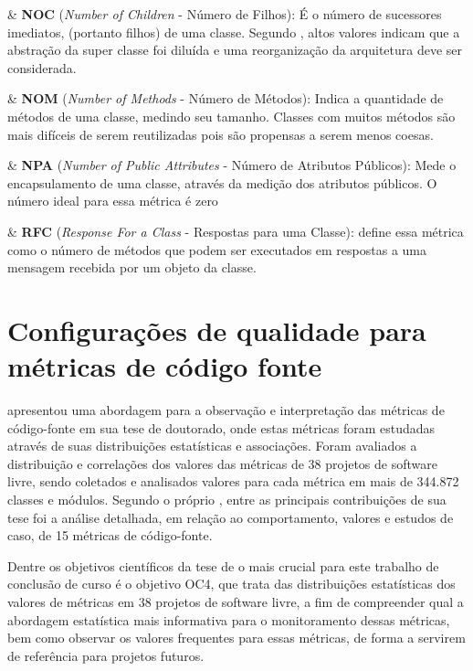 \begin{easylist}
	& \textbf{NOC} (\textit{Number of Children} - Número de Filhos): É o número de sucessores imediatos,  (portanto filhos) de uma classe. Segundo , altos valores indicam que a abstração da super classe foi diluída e uma reorganização da arquitetura deve ser considerada.
	
	& \textbf{NOM} (\textit{Number of Methods} - Número de Métodos): Indica a quantidade de métodos de uma classe, medindo seu tamanho. Classes com muitos métodos são mais difíceis de serem reutilizadas pois são propensas a serem menos coesas. \cite{Meirelles2013}  

	& \textbf{NPA} (\textit{Number of Public Attributes} - Número de Atributos Públicos): Mede o encapsulamento de uma classe, através da medição dos atributos públicos. O número ideal para essa métrica é zero \cite{Meirelles2013}

	& \textbf{RFC} (\textit{Response For a Class} - Respostas para uma Classe):  define essa métrica como o número de métodos que podem ser executados em respostas a uma mensagem recebida por um objeto da classe.

\end{easylist}	


\section{Configurações de qualidade para métricas de código fonte} 

 apresentou uma abordagem para a observação e interpretação das métricas de código-fonte em sua tese de doutorado, onde estas métricas foram estudadas através de suas distribuições estatísticas e associações. Foram avaliados a distribuição e correlações dos valores das métricas de 38 projetos de software livre, sendo coletados e analisados valores para cada métrica em mais de 344.872 classes e módulos. Segundo o próprio , entre as principais contribuições de sua tese foi a análise detalhada, em relação ao comportamento, valores e estudos de caso, de 15 métricas de código-fonte. 

Dentre os objetivos científicos da tese de  o mais crucial para este trabalho de conclusão de curso é o objetivo OC4, que trata das distribuições estatísticas dos valores de métricas em 38 projetos de software livre, a fim de compreender qual a abordagem estatística mais informativa para o monitoramento dessas métricas, bem como observar os valores frequentes para essas métricas, de forma a servirem de referência para projetos futuros.

